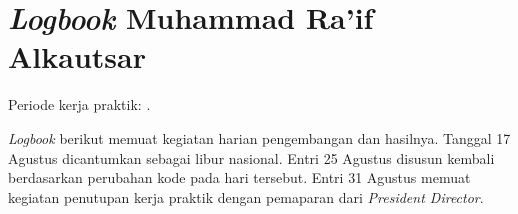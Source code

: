 \chapter{\textit{Logbook} Muhammad Ra'if Alkautsar}\label{app:logbook}
Periode kerja praktik: \PeriodeKP.

\textit{Logbook} berikut memuat kegiatan harian pengembangan dan hasilnya. Tanggal 17 Agustus dicantumkan sebagai libur nasional. Entri 25 Agustus disusun kembali berdasarkan perubahan kode pada hari tersebut. Entri 31 Agustus memuat kegiatan penutupan kerja praktik dengan pemaparan dari \textit{President Director}.

